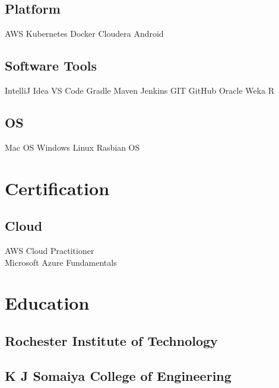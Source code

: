 \documentclass[]{main}
\begin{document}
\begin{minipage}[t]{0.25\textwidth}
\subsection{Platform}\sectionsep
                    AWS 
    \textbullet{}   Kubernetes
    \textbullet{}   Docker
    \textbullet{}   Cloudera
    \textbullet{}   Android
\sectionsep\sectionsep
\subsection{Software Tools}\sectionsep
                    IntelliJ Idea  
    \textbullet{}   VS Code 
    \textbullet{}   Gradle 
    \textbullet{}   Maven  
    \textbullet{}   Jenkins  
    \textbullet{}   GIT 
    \textbullet{}   GitHub  
    \textbullet{}   Oracle  
    \textbullet{}   Weka 
    \textbullet{}   R
\sectionsep\sectionsep
\subsection{OS}\sectionsep
                    Mac OS  
    \textbullet{}   Windows 
    \textbullet{}   Linux  
    \textbullet{}   Rasbian OS
\sectionsep\sectionsep

\section{Certification}

\subsection{Cloud}
\sectionsep
AWS Cloud Practitioner\\
Microsoft Azure Fundamentals\\
\sectionsep

\section{Education} 
\subsection{Rochester Institute of Technology}
\sectionsep
{}
\sectionsep\sectionsep

\subsection{K J Somaiya College of Engineering}
\sectionsep
{}
\sectionsep\sectionsep

%
%

\end{minipage} 
\end{document}
